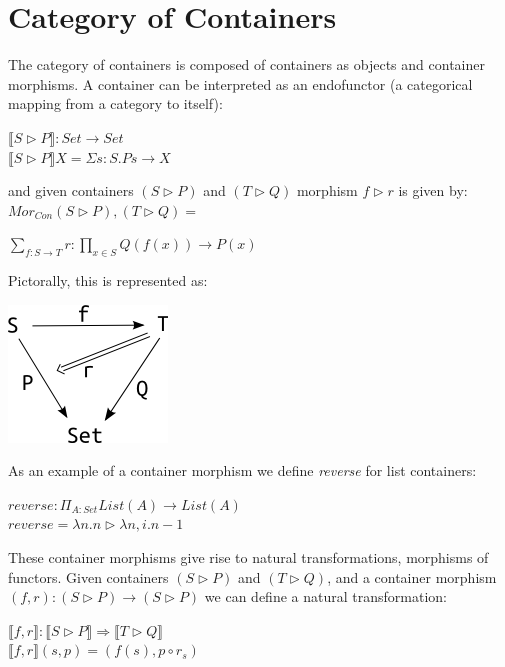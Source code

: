 \documentclass[12pt]{report}
\begin{document}
\section{Category of Containers}
The category of containers is composed of containers as objects and container morphisms.
A container can be interpreted as an endofunctor (a categorical mapping from a category to itself):
\begin{center}
$\llbracket S \rhd P\rrbracket : Set \to Set$\\
$ \llbracket S \rhd P\rrbracket X = \Sigma s : S. P s \to X $
\end{center}
and given containers $ (S \rhd P)$ and $ (T \rhd Q)$ morphism $ f \rhd r $ is given by:
\linebreak
\linebreak
$Mor_{Con}(S \rhd P),(T \rhd Q) = $
\begin{center}
$ \sum_{f : S \to T} r : \prod_{x \in S} Q(f(x)) \to P(x)$
\end{center}
Pictorally, this is represented as:
\begin{center}
\includegraphics[scale=1]{conmor.png}
\end{center}
As an example of a container morphism we define \textit{reverse} for list containers:
\begin{center}
$reverse:\Pi_{A:Set} List(A) \to List(A)$\\
$reverse = \lambda n.n \rhd \lambda n,i.n-1$
\end{center}

\newpage
These container morphisms give rise to natural transformations, morphisms of functors. Given containers $ (S \rhd P)$ and $ (T \rhd Q)$, and a container morphism $ (f , r) : (S \rhd P) \to (S \rhd P)$ we can define a natural transformation:
\begin{center}
$ \llbracket f,r\rrbracket : \llbracket S \rhd P\rrbracket \Rightarrow \llbracket T \rhd Q\rrbracket$ \\
$  \llbracket f,r\rrbracket (s,p) = (f(s),p \circ r_s) $
\end{center}
\end{document}
